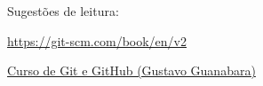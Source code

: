 \begin{frame}
Sugestões de leitura: 
\vspace{2ex}

\url{https://git-scm.com/book/en/v2}

\vspace{3ex}
\href{https://www.youtube.com/watch?v=xEKo29OWILE&list=PLHz_AreHm4dm7ZULPAmadvNhH6vk9oNZA}{Curso de Git e GitHub (Gustavo Guanabara)}

\end{frame}



